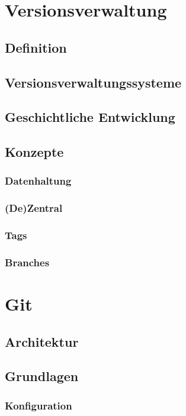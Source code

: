 \chapter{Versionsverwaltung}
\label{cha:Versionsverwaltung}
\section{Definition}
\label{sec:Definition}
\section{Versionsverwaltungssysteme}
\label{sec:systems}
\section{Geschichtliche Entwicklung}
\label{sec:GeschichtlicheEntwicklung}
\section{Konzepte}
\label{sec:Konzepte}
\subsection{Datenhaltung}
\label{sec:Datenhaltung}
\subsection{(De)Zentral}
\label{sec:dezentral}
\subsection{Tags}
\label{sec:Tags}
\subsection{Branches}
\label{sec:Branches}

\chapter{Git}
\label{cha:Git}
\section{Architektur}
\label{sec:Architektur}
\section{Grundlagen}
\label{sec:Grundlagen}
\subsection{Konfiguration}
\label{sec:Konfiguration}
